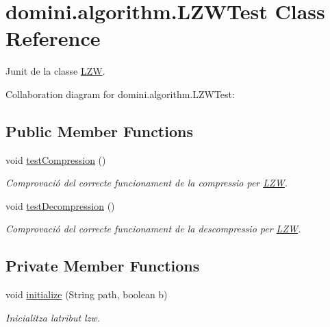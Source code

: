 \hypertarget{classdomini_1_1algorithm_1_1LZWTest}{}\section{domini.\+algorithm.\+L\+Z\+W\+Test Class Reference}
\label{classdomini_1_1algorithm_1_1LZWTest}


Junit de la classe \hyperlink{classdomini_1_1algorithm_1_1LZW}{L\+ZW}.  




Collaboration diagram for domini.\+algorithm.\+L\+Z\+W\+Test\+:
\subsection*{Public Member Functions}
\begin{DoxyCompactItemize}
\item 
void \hyperlink{classdomini_1_1algorithm_1_1LZWTest_ae43f1a846dc9672b04c707314006a878}{test\+Compression} ()
\begin{DoxyCompactList}\small\item\em Comprovació del correcte funcionament de la compressio per \hyperlink{classdomini_1_1algorithm_1_1LZW}{L\+ZW}. \end{DoxyCompactList}\item 
void \hyperlink{classdomini_1_1algorithm_1_1LZWTest_aa9f013d2d8e008768c6c7b8fe319b534}{test\+Decompression} ()
\begin{DoxyCompactList}\small\item\em Comprovació del correcte funcionament de la descompressio per \hyperlink{classdomini_1_1algorithm_1_1LZW}{L\+ZW}. \end{DoxyCompactList}\end{DoxyCompactItemize}
\subsection*{Private Member Functions}
\begin{DoxyCompactItemize}
\item 
void \hyperlink{classdomini_1_1algorithm_1_1LZWTest_acf4cac88aafa2144dc8ce3a80453fa90}{initialize} (String path, boolean b)
\begin{DoxyCompactList}\small\item\em Inicialitza l\textquotesingle{}atribut lzw. \end{DoxyCompactList}\end{DoxyCompactItemize}
